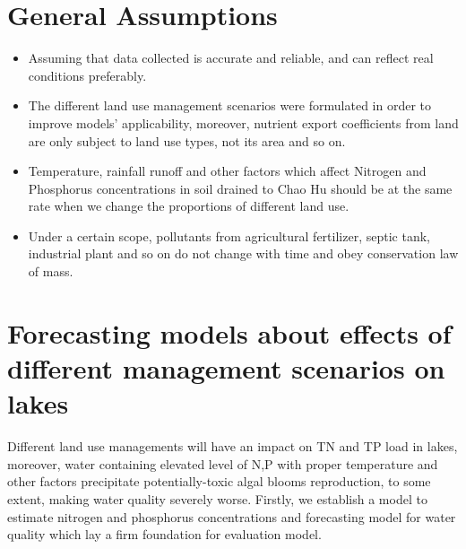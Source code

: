 \documentclass[12pt,a4paper]{article}
\begin{document}

\section{General Assumptions}
\begin{itemize}
    \item Assuming that data collected is accurate and reliable, and can reflect real conditions preferably.
    \item The different land use management scenarios were formulated in order to improve models' applicability, moreover, nutrient export coefficients from land are only subject to land use types, not its area and so on.
    \item Temperature, rainfall runoff and other factors which affect Nitrogen and Phosphorus concentrations in soil drained to Chao Hu should be at the same rate when we change the proportions of different land use.      
    \item Under a certain scope, pollutants from agricultural fertilizer, septic tank, industrial plant and so on do not change with time and obey conservation law of mass.
\end{itemize}\par

\section{Forecasting models about effects of different management scenarios on lakes}
Different land use managements will have an impact on TN and TP load in lakes,
moreover, water containing elevated level of N,P with proper temperature and other factors precipitate potentially-toxic algal blooms reproduction, to some extent, making water quality severely worse. Firstly, we establish a model to estimate nitrogen and phosphorus concentrations and forecasting model for water quality which lay a firm foundation for evaluation model.\par
\end{document}
